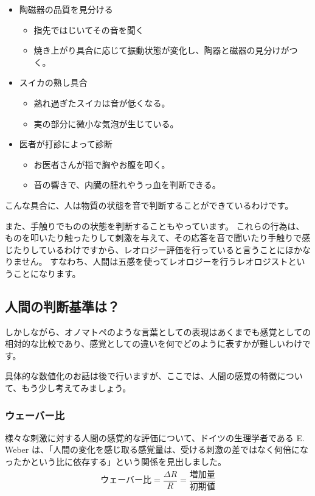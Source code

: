 \documentclass[uplatex,dvipdfmx,a4paper,11pt]{jsreport}
\begin{document}
\begin{itemize}
	\item 陶磁器の品質を見分ける
	\begin{itemize}
		\item 指先ではじいてその音を聞く
		\item 焼き上がり具合に応じて振動状態が変化し、陶器と磁器の見分けがつく。
	\end{itemize}
	\item スイカの熟し具合
	\begin{itemize}
		\item 熟れ過ぎたスイカは音が低くなる。
		\item 実の部分に微小な気泡が生じている。
	\end{itemize}
	\item 医者が打診によって診断
	\begin{itemize}
		\item お医者さんが指で胸やお腹を叩く。
		\item 音の響きで、内臓の腫れやうっ血を判断できる。
	\end{itemize}
\end{itemize}

こんな具合に、人は物質の状態を音で判断することができているわけです。

また、手触りでものの状態を判断することもやっています。
これらの行為は、ものを叩いたり触ったりして刺激を与えて、その応答を音で聞いたり手触りで感じたりしているわけですから、レオロジー評価を行っていると言うことにほかなりません。
すなわち、人間は五感を使ってレオロジーを行うレオロジストということになります。

\subsection{人間の判断基準は？}

しかしながら、オノマトペのような言葉としての表現はあくまでも感覚としての相対的な比較であり、感覚としての違いを何でどのように表すかが難しいわけです。

具体的な数値化のお話は後で行いますが、ここでは、人間の感覚の特徴について、もう少し考えてみましょう。

\subsubsection{ウェーバー比}

様々な刺激に対する人間の感覚的な評価について、ドイツの生理学者である E. Weber は、「人間の変化を感じ取る感覚量は、受ける刺激の差ではなく何倍になったかという比に依存する」という関係を見出しました。
\begin{align*}
	\text{ウェーバー比} = \dfrac{\Delta R}{R}= \dfrac{\text{増加量}}{\text{初期値}}
\end{align*}
\end{document}
